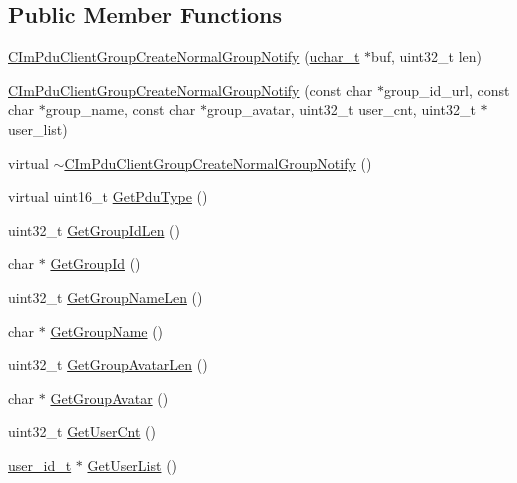 \subsection*{Public Member Functions}
\begin{DoxyCompactItemize}
\item 
\hyperlink{class_c_im_pdu_client_group_create_normal_group_notify_aff5a27b2d1f944df5f4bae3ba5054df1}{C\+Im\+Pdu\+Client\+Group\+Create\+Normal\+Group\+Notify} (\hyperlink{base_2ostype_8h_a124ea0f8f4a23a0a286b5582137f0b8d}{uchar\+\_\+t} $\ast$buf, uint32\+\_\+t len)
\item 
\hyperlink{class_c_im_pdu_client_group_create_normal_group_notify_ab750597497a8df8fded6e39256f28f59}{C\+Im\+Pdu\+Client\+Group\+Create\+Normal\+Group\+Notify} (const char $\ast$group\+\_\+id\+\_\+url, const char $\ast$group\+\_\+name, const char $\ast$group\+\_\+avatar, uint32\+\_\+t user\+\_\+cnt, uint32\+\_\+t $\ast$user\+\_\+list)
\item 
virtual \hyperlink{class_c_im_pdu_client_group_create_normal_group_notify_ad6f7efc6024f840413e8b23a20b3fc1f}{$\sim$\+C\+Im\+Pdu\+Client\+Group\+Create\+Normal\+Group\+Notify} ()
\item 
virtual uint16\+\_\+t \hyperlink{class_c_im_pdu_client_group_create_normal_group_notify_a7ad847e0f5dfc0e0dbbd07ad9f5672d6}{Get\+Pdu\+Type} ()
\item 
uint32\+\_\+t \hyperlink{class_c_im_pdu_client_group_create_normal_group_notify_a65346330d7f5768beaae7fb18d9b0eab}{Get\+Group\+Id\+Len} ()
\item 
char $\ast$ \hyperlink{class_c_im_pdu_client_group_create_normal_group_notify_a5bd44a9c7d8763d6b1154d39f930b189}{Get\+Group\+Id} ()
\item 
uint32\+\_\+t \hyperlink{class_c_im_pdu_client_group_create_normal_group_notify_a6e9358b83a0242e7674c598bc3a66775}{Get\+Group\+Name\+Len} ()
\item 
char $\ast$ \hyperlink{class_c_im_pdu_client_group_create_normal_group_notify_a64f19f96855c85e64e3a52ecb6ab7dca}{Get\+Group\+Name} ()
\item 
uint32\+\_\+t \hyperlink{class_c_im_pdu_client_group_create_normal_group_notify_a65e5e3dd0f9a363fff65eab872768a59}{Get\+Group\+Avatar\+Len} ()
\item 
char $\ast$ \hyperlink{class_c_im_pdu_client_group_create_normal_group_notify_a1589ca6e2f7b47d8848937ef48e8c7b0}{Get\+Group\+Avatar} ()
\item 
uint32\+\_\+t \hyperlink{class_c_im_pdu_client_group_create_normal_group_notify_acac13c7bf0321dc50bd1a9b460e98c33}{Get\+User\+Cnt} ()
\item 
\hyperlink{structuser__id__t}{user\+\_\+id\+\_\+t} $\ast$ \hyperlink{class_c_im_pdu_client_group_create_normal_group_notify_a428e34e835e9b5d78480222ba56086fa}{Get\+User\+List} ()
\end{DoxyCompactItemize}
